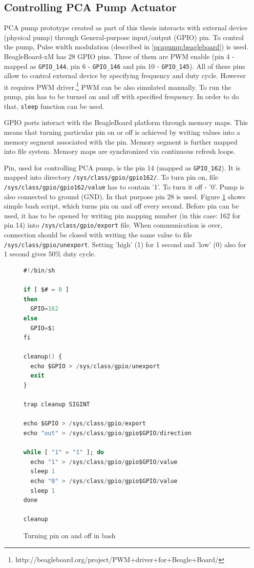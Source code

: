 \subsection{Controlling PCA Pump Actuator}
\label{pcapumpimpl:beagleboard:pcapumpmotor}

PCA pump prototype created as part of this thesis interacts with external device (physical pump) through General-purpose input/output (GPIO) pin. To control the pump, Pulse width modulation (described in \ref{pcapump:beagleboard}) is used. BeagleBoard-xM has 28 GPIO pins. Three of them are PWM enable (pin 4 - mapped as \lstinline{GPIO_144}, pin 6 - \lstinline{GPIO_146} and pin 10 - \lstinline{GPIO_145}). All of these pins allow to control external device by specifying frequency and duty cycle. However it requires PWM driver.\footnote{http://beagleboard.org/project/PWM+driver+for+Beagle+Board/} PWM can be also simulated manually. To run the pump, pin has to be turned on and off with specified frequency. In order to do that, \lstinline{sleep} function can be used. 

GPIO ports interact with the BeagleBoard platform through memory maps. This means that turning particular pin on or off is achieved by writing values into a memory segment associated with the pin. Memory segment is further mapped into file system. Memory maps are synchronized via continuous refresh loops.

Pin, used for controlling PCA pump, is the pin 14 (mapped as \lstinline{GPIO_162}). It is mapped into directory \lstinline{/sys/class/gpio/gpio162/}. To turn pin on, file \lstinline{/sys/class/gpio/gpio162/value} has to contain '1'. To turn it off - '0'. Pump is also connected to ground (GND). In that purpose pin 28 is used. Figure \ref{listing:SwitchingPin} shows simple bash script, which turns pin on and off every second. Before pin can be used, it has to be opened by writing pin mapping number (in this case: 162 for pin 14) into \lstinline{/sys/class/gpio/export} file. When communication is over, connection should be closed with writing the same value to file \lstinline{/sys/class/gpio/unexport}. Setting 'high' (1) for 1 second and 'low' (0) also for 1 second gives 50\% duty cycle.

\begin{figure}[ht]
\singlespacing
\begin{lstlisting}[language=ada, frame=single, gobble=0]
#!/bin/sh

if [ $# = 0 ]
then
  GPIO=162
else
  GPIO=$1
fi

cleanup() {
  echo $GPIO > /sys/class/gpio/unexport
  exit
}

trap cleanup SIGINT

echo $GPIO > /sys/class/gpio/export
echo "out" > /sys/class/gpio/gpio$GPIO/direction

while [ "1" = "1" ]; do
  echo "1" > /sys/class/gpio/gpio$GPIO/value
  sleep 1
  echo "0" > /sys/class/gpio/gpio$GPIO/value
  sleep 1
done

cleanup
\end{lstlisting} 
\doublespacing
\caption{Turning pin on and off in bash}
\label{listing:SwitchingPin}
\end{figure}

